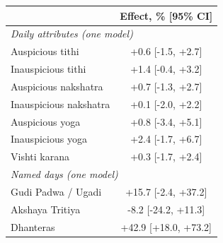 \begin{tabular}{lc}
\toprule
 & Effect, \% [95\% CI] \\
\midrule
\multicolumn{2}{l}{\textit{Daily attributes (one model)}} \\
\quad Auspicious tithi & +0.6 [-1.5, +2.7] \\
\quad Inauspicious tithi & +1.4 [-0.4, +3.2] \\
\quad Auspicious nakshatra & +0.7 [-1.3, +2.7] \\
\quad Inauspicious nakshatra & +0.1 [-2.0, +2.2] \\
\quad Auspicious yoga & +0.8 [-3.4, +5.1] \\
\quad Inauspicious yoga & +2.4 [-1.7, +6.7] \\
\quad Vishti karana & +0.3 [-1.7, +2.4] \\
\multicolumn{2}{l}{\textit{Named days (one model)}} \\
\quad Gudi Padwa / Ugadi & +15.7 [-2.4, +37.2] \\
\quad Akshaya Tritiya & -8.2 [-24.2, +11.3] \\
\quad Dhanteras & +42.9 [+18.0, +73.2] \\
\bottomrule
\end{tabular}

